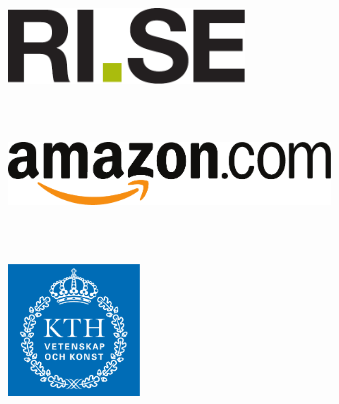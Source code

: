 \documentclass[final]{beamer}
\newlength{\sepwid}
\newlength{\onecolwid}
\begin{document}
\begin{frame}[t]
\begin{columns}[t]
\begin{column}{\onecolwid}
\begin{figure}
	\centering
	\begin{subfigure}[c]{0.3\textwidth}
		\centering
		\includegraphics[height=2cm]{rise_logo_horizontal_cmyk}
	\end{subfigure}
	~
	\begin{subfigure}[c]{0.3\textwidth}
		\centering
		\includegraphics[height=2cm]{amazon}
	\end{subfigure}
	~
	\begin{subfigure}[c]{0.3\textwidth}
		\centering
		\includegraphics[height=3.5cm]{kth}
	\end{subfigure}
	\end{figure}


\end{column} %

\begin{column}{\sepwid}\end{column} %

\end{columns} %

\end{frame} %
\end{document}
